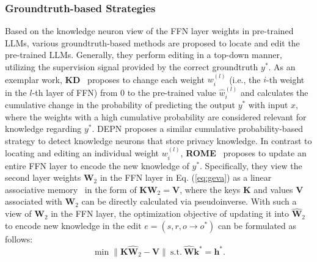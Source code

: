 \documentclass[acmsmall, screen]{acmart}
\begin{document}

\subsubsection{\textbf{Groundtruth-based Strategies}} Based on the knowledge neuron view of the FFN layer weights in pre-trained LLMs, various {groundtruth-based} methods are proposed to locate and edit the pre-trained LLMs. Generally, they perform editing in a top-down manner, utilizing the supervision signal provided by the correct {groundtruth} $y^*$. As an exemplar work, \textbf{KD}~\cite{dai2022knowledge} proposes to change each weight $w^{(l)}_{i}$ (i.e., the $i$-th weight in the $l$-th layer of FFN) from 0 to the pre-trained value $\hat{w}^{(l)}_{i}$ and calculates the cumulative change in the probability of predicting the output $y^{*}$ with input $x$, where the weights with a high cumulative probability are considered relevant for knowledge regarding $y^{*}$. {DEPN \cite{wu2023depn} proposes a similar cumulative probability-based strategy to detect knowledge neurons that store privacy knowledge.} In contrast to locating and editing an individual weight ${w}^{(l)}_{i}$, \textbf{ROME}~\cite{meng2022locating} proposes to update an entire FFN layer to encode the new knowledge of $y^{*}$. Specifically, they view the second layer weights $\textbf{W}_{2}$ in the FFN layer in Eq. (\ref{eq:geva}) as a linear associative memory~\cite{kohonen1972correlation,anderson1972simple} in the form of $\textbf{K}\textbf{W}_{2} = \textbf{V}$, where the keys $\textbf{K}$ and values $\textbf{V}$ associated with $\textbf{W}_{2}$ can be directly calculated via pseudoinverse. With such a view of $\textbf{W}_{2}$ in the FFN layer, the optimization objective of updating it into $\hat{\textbf{W}}_{2}$ to encode new knowledge in the edit $e = (s,r,o\rightarrow o^{*})$ can be formulated as follows:
\begin{equation}
\label{eq:meng2022}
\min \|\textbf{K}\hat{\textbf{W}}_{2} - \textbf{V}\| \ \text{s.t.} \ \hat{\textbf{W}} \textbf{k}^*=\textbf{h}^*.
\end{equation}
\end{document}

